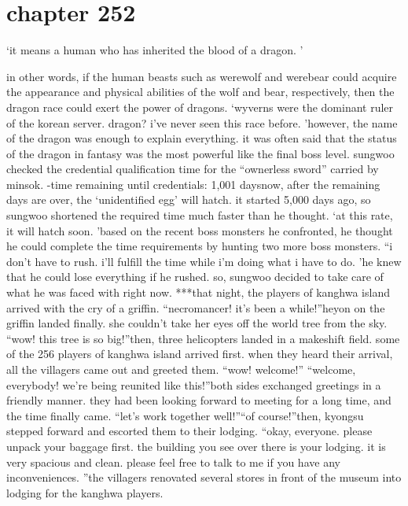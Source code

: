 \section{chapter 252}

                            ‘it means a human who has inherited the blood of a dragon.
’




in other words, if the human beasts such as werewolf and werebear could acquire the appearance and physical abilities of the wolf and bear, respectively, then the dragon race could exert the power of dragons.
‘wyverns were the dominant ruler of the korean server.
 dragon? i’ve never seen this race before.
’however, the name of the dragon was enough to explain everything.
 it was often said that the status of the dragon in fantasy was the most powerful like the final boss level.
sungwoo checked the credential qualification time for the “ownerless sword” carried by minsok.
-time remaining until credentials: 1,001 daysnow, after the remaining days are over, the ‘unidentified egg’ will hatch.
 it started 5,000 days ago, so sungwoo shortened the required time much faster than he thought.
‘at this rate, it will hatch soon.
’based on the recent boss monsters he confronted, he thought he could complete the time requirements by hunting two more boss monsters.
“i don’t have to rush.
 i’ll fulfill the time while i’m doing what i have to do.
’he knew that he could lose everything if he rushed.
so, sungwoo decided to take care of what he was faced with right now.
***that night, the players of kanghwa island arrived with the cry of a griffin.
“necromancer! it’s been a while!”heyon on the griffin landed finally.
 she couldn’t take her eyes off the world tree from the sky.
“wow! this tree is so big!”then, three helicopters landed in a makeshift field.
 some of the 256 players of kanghwa island arrived first.
when they heard their arrival, all the villagers came out and greeted them.
“wow! welcome!”
“welcome, everybody! we’re being reunited like this!”both sides exchanged greetings in a friendly manner.
 they had been looking forward to meeting for a long time, and the time finally came.
“let’s work together well!”“of course!”then, kyongsu stepped forward and escorted them to their lodging.
“okay, everyone.
 please unpack your baggage first.
 the building you see over there is your lodging.
 it is very spacious and clean.
 please feel free to talk to me if you have any inconveniences.
”the villagers renovated several stores in front of the museum into lodging for the kanghwa players.
